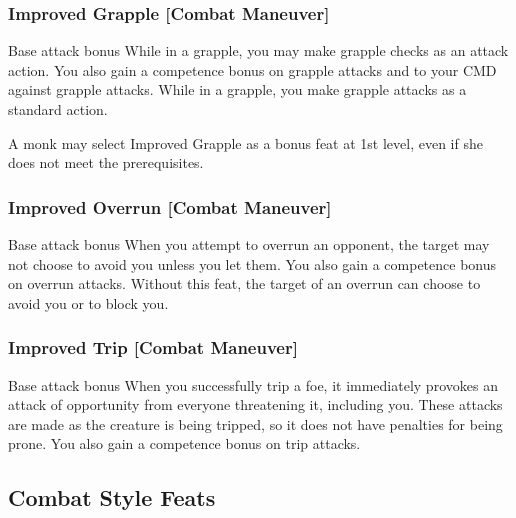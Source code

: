 \subsubsection{Improved Grapple [Combat Maneuver]}
 Base attack bonus 
 While in a grapple, you may make grapple checks as an attack action. You also gain a  competence bonus on grapple attacks and to your CMD against grapple attacks.
 While in a grapple, you make grapple attacks as a standard action.
\par A monk may select Improved Grapple as a bonus feat at 1st level, even if she does not meet the prerequisites.

\subsubsection{Improved Overrun [Combat Maneuver]}
 Base attack bonus 
 When you attempt to overrun an opponent, the target may not choose to avoid you unless you let them. You also gain a  competence bonus on overrun attacks.
 Without this feat, the target of an overrun can choose to avoid you or to block you.

\begin{comment}
\subsubsection{Improved Sunder [Combat Maneuver]}
\parhead{Prerequisites} Base attack bonus \plus4
\parhead{Benefit} When you strike at an object held or carried by an opponent (such as a weapon or shield), you ignore half the hardness of the sundered item. You also gain a \plus2 competence bonus on sunder attacks.
\end{comment}

\subsubsection{Improved Trip [Combat Maneuver]}
 Base attack bonus 
 When you successfully trip a foe, it immediately provokes an attack of opportunity from everyone threatening it, including you. These attacks are made as the creature is being tripped, so it does not have penalties for being prone. You also gain a  competence bonus on trip attacks.

\subsection{Combat Style Feats}


